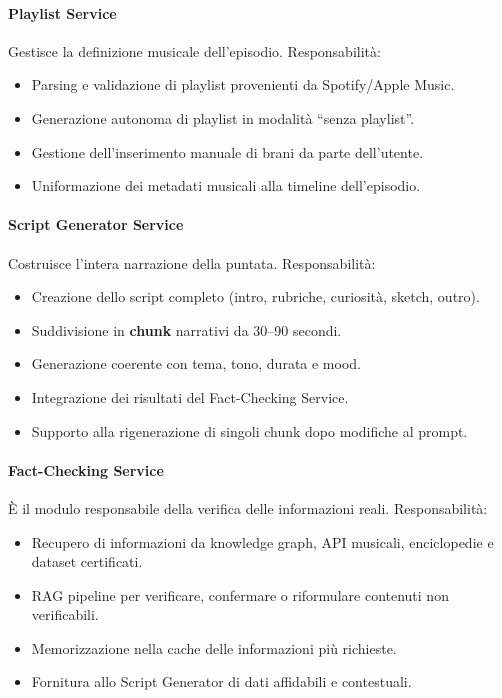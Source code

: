 \documentclass[11pt,a4paper]{article}
\begin{document}
\paragraph{Playlist Service}
Gestisce la definizione musicale dell’episodio.  
Responsabilità:
\begin{itemize}
    \item Parsing e validazione di playlist provenienti da Spotify/Apple Music.
    \item Generazione autonoma di playlist in modalità “senza playlist”.
    \item Gestione dell’inserimento manuale di brani da parte dell’utente.
    \item Uniformazione dei metadati musicali alla timeline dell’episodio.
\end{itemize}

\paragraph{Script Generator Service}
Costruisce l’intera narrazione della puntata.  
Responsabilità:
\begin{itemize}
    \item Creazione dello script completo (intro, rubriche, curiosità, sketch, outro).
    \item Suddivisione in \textbf{chunk} narrativi da 30--90 secondi.
    \item Generazione coerente con tema, tono, durata e mood.
    \item Integrazione dei risultati del Fact-Checking Service.
    \item Supporto alla rigenerazione di singoli chunk dopo modifiche al prompt.
\end{itemize}

\paragraph{Fact-Checking Service}
È il modulo responsabile della verifica delle informazioni reali.  
Responsabilità:
\begin{itemize}
    \item Recupero di informazioni da knowledge graph, API musicali, enciclopedie e dataset certificati.
    \item RAG pipeline per verificare, confermare o riformulare contenuti non verificabili.
    \item Memorizzazione nella cache delle informazioni più richieste.
    \item Fornitura allo Script Generator di dati affidabili e contestuali.
\end{itemize}
\end{document}
